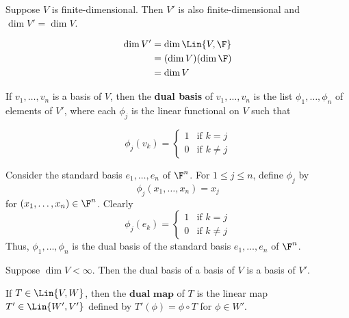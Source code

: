 \begin{theorem} [$\dim V' = \dim V$]
   Suppose $V$ is finite-dimensional. Then $V'$ is also finite-dimensional
   and $\dim V' = \dim V$.

   \begin{proof*}
      \begin{align*}
         \dim V' &= \dim \Lin{V, \F} \\
         &= (\dim V)(\dim \F) \\
         &= \dim V
      \end{align*}
   \end{proof*}
\end{theorem}

\begin{definition}
   If $v_1, \dots, v_n$ is a basis of $V$, then the \textbf{dual basis}
   of $v_1, \dots, v_n$ is the list $\phi_1, \dots, \phi_n$ of elements
   of $V'$, where each $\phi_j$ is the linear functional on $V$ such that

   \[ \phi_j(v_k) = 
   \begin{cases}
      1 & \text{if } k = j \\
      0 & \text{if } k \neq j 
   \end{cases}
   \]
\end{definition}

\begin{example}
   Consider the standard basis $e_1, \dots, e_n$ of $\F^n$.
   For $1 \leq j \leq n$, define $\phi_j$ by
   \[ \phi_j(x_1, \dots, x_n) = x_j \]
   for $(x_1, \dots, x_n) \in \F^n$. Clearly
   \[ \phi_j(e_k) = \begin{cases}
      1 & \text{if } k = j \\
      0 & \text{if } k \neq j 
   \end{cases} \]
   Thus, $\phi_1, \dots, \phi_n$ is the dual basis of the
   standard basis $e_1, \dots, e_n$ of $\F^n$.
\end{example}

\begin{theorem}
   Suppose $\dim V < \infty$. Then the dual basis
   of a basis of $V$ is a basis of $V'$.
\end{theorem}

\begin{definition} 
   If $T \in \Lin{V, W}$, then the $\textbf{dual map}$ of $T$ is
   the linear map $T' \in \Lin{W', V'}$ defined by $T'(\phi) = \phi \circ T$
   for $\phi \in W'$.
\end{definition}

